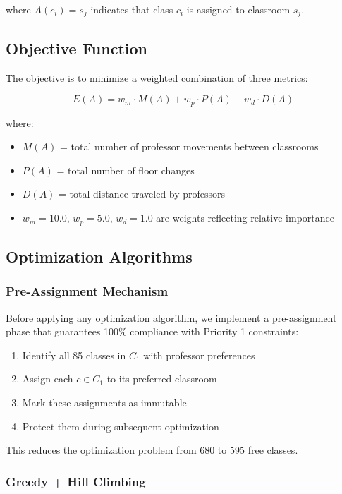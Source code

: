 \documentclass[12pt,a4paper]{article}
\begin{document}
where $A(c_i) = s_j$ indicates that class $c_i$ is assigned to classroom $s_j$.

\subsection{Objective Function}

The objective is to minimize a weighted combination of three metrics:

\begin{equation}
E(A) = w_m \cdot M(A) + w_p \cdot P(A) + w_d \cdot D(A)
\label{eq:objective}
\end{equation}

where:
\begin{itemize}
\item $M(A)$ = total number of professor movements between classrooms
\item $P(A)$ = total number of floor changes
\item $D(A)$ = total distance traveled by professors
\item $w_m = 10.0$, $w_p = 5.0$, $w_d = 1.0$ are weights reflecting relative importance
\end{itemize}

\subsection{Optimization Algorithms}

\subsubsection{Pre-Assignment Mechanism}

Before applying any optimization algorithm, we implement a pre-assignment phase that guarantees 100\% compliance with Priority 1 constraints:

\begin{enumerate}
\item Identify all 85 classes in $C_1$ with professor preferences
\item Assign each $c \in C_1$ to its preferred classroom
\item Mark these assignments as immutable
\item Protect them during subsequent optimization
\end{enumerate}

This reduces the optimization problem from 680 to 595 free classes.

\subsubsection{Greedy + Hill Climbing}
\end{document}
